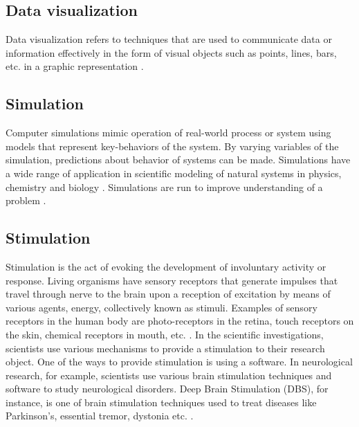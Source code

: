 \subsection{Data visualization}
\label{sec:purpose:Types:visualization}

Data visualization refers to techniques that are used to communicate data or information effectively in the form of visual objects such as points, lines, bars, etc. in a graphic representation \citep{enwiki:1059912747}.  

\subsection{Simulation}
\label{sec:purpose:Types:Simulation}

Computer simulations mimic operation of real-world process or system using models that represent key-behaviors of the system. By varying variables of the simulation, predictions about behavior of systems can be made. Simulations have a wide range of application in scientific modeling of natural systems in physics, chemistry and biology \citep{enwiki:1061669086}. Simulations are run to improve understanding of a problem  \citep{segal2008developing}.


\subsection{Stimulation}
\label{sec:purpose:Types:Stimulation}

Stimulation is the act of evoking the development of involuntary activity or response. Living organisms have sensory receptors that generate impulses that travel through nerve to the brain upon a reception of excitation by means of various agents, energy, collectively known as stimuli. Examples of sensory receptors in the human body are photo-receptors in the retina, touch receptors on the skin, chemical receptors in mouth, etc. \citep{enwiki:976395276}. 
In the scientific investigations, scientists use various mechanisms to provide a stimulation to their research object. One of the ways to provide stimulation is using a software. In neurological research, for example, scientists use various brain stimulation techniques and software to study neurological disorders.  Deep Brain Stimulation (DBS), for instance, is one of brain stimulation techniques used to treat diseases like Parkinson’s, essential tremor, dystonia etc. \citep{schermer2011ethical}.




